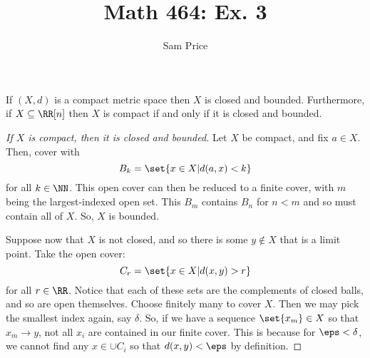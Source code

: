 \documentclass{article}
\author{Sam Price}
\date{}
\title{Math 464: Ex. 3}
\begin{document}
\maketitle

\begin{theorem}
  If $(X, d)$ is a compact metric space then $X$ is closed and bounded.
  Furthermore, if $X \subseteq \RR[n]$ then $X$ is compact if and only if it is closed and bounded.
\end{theorem}

\begin{proof}[If $X$ is compact, then it is closed and bounded]
  Let $X$ be compact, and fix $a \in X$. Then, cover with
  \[ B_{k} = \set{ x \in X | d(a, x) < k } \]
  for all $k \in \NN$.
  This open cover can then be reduced to a finite cover, with $m$ being the largest-indexed open set.
  This $B_{m}$ contains $B_{n}$ for $n < m$ and so must contain all of $X$. So, $X$ is bounded.

  Suppose now that $X$ is not closed, and so there is some $y \notin X$ that is a limit point.
  Take the open cover:
  \[ C_{r} = \set{ x \in X | d(x, y) > r } \]
  for all $r \in \RR$. Notice that each of these sets are the complements of closed balls, and so are open themselves.
  Choose finitely many to cover $X$. Then we may pick the smallest index again, say $\delta$.
  So, if we have a sequence $\set{x_{m}} \in X$ so that $x_{m} \to y$, not all $x_{i}$ are contained in our finite cover.
  This is because for $\eps < \delta$, we cannot find any $x \in \cup C_{i}$ so that $d(x, y) < \eps$ by definition.
\end{proof}
\end{document}
